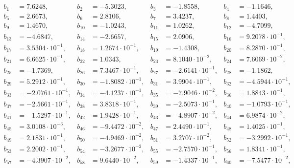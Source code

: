 \begin{align*}
&&&&&&& \\ 
b_{ 1 } &= 7.6248, & b_{ 2 } &= -5.3023, & b_{ 3 } &= -1.8558, & b_{ 4 } &= -1.1646,\\ 
b_{ 5 } &= 2.6673, & b_{ 6 } &= 2.8106, & b_{ 7 } &= 3.4237, & b_{ 8 } &= 1.4403,\\ 
b_{ 9 } &= 1.4670, & b_{ 10 } &= -1.0243, & b_{ 11 } &= 1.0262, & b_{ 12 } &= -4.7099,\\ 
b_{ 13 } &= -4.6847, & b_{ 14 } &= -2.6657, & b_{ 15 } &= 2.0906, & b_{ 16 } &= 9.2078 \cdot 10^{ -1 },\\ 
b_{ 17 } &= 3.5304 \cdot 10^{ -1 }, & b_{ 18 } &= 1.2674 \cdot 10^{ -1 }, & b_{ 19 } &= -1.4308, & b_{ 20 } &= 8.2870 \cdot 10^{ -1 },\\ 
b_{ 21 } &= 6.6625 \cdot 10^{ -1 }, & b_{ 22 } &= 1.0343, & b_{ 23 } &= 8.1040 \cdot 10^{ -2 }, & b_{ 24 } &= 7.6069 \cdot 10^{ -2 },\\ 
b_{ 25 } &= -1.7369, & b_{ 26 } &= 7.3467 \cdot 10^{ -1 }, & b_{ 27 } &= -2.6141 \cdot 10^{ -1 }, & b_{ 28 } &= -1.1862,\\ 
b_{ 29 } &= 5.2912 \cdot 10^{ -1 }, & b_{ 30 } &= -1.8082 \cdot 10^{ -1 }, & b_{ 31 } &= 3.9904 \cdot 10^{ -1 }, & b_{ 32 } &= -4.5944 \cdot 10^{ -1 },\\ 
b_{ 33 } &= -2.0761 \cdot 10^{ -1 }, & b_{ 34 } &= -4.1237 \cdot 10^{ -1 }, & b_{ 35 } &= -7.9046 \cdot 10^{ -2 }, & b_{ 36 } &= 1.8843 \cdot 10^{ -1 },\\ 
b_{ 37 } &= -2.5661 \cdot 10^{ -1 }, & b_{ 38 } &= 3.8318 \cdot 10^{ -1 }, & b_{ 39 } &= -2.5073 \cdot 10^{ -1 }, & b_{ 40 } &= -1.0793 \cdot 10^{ -1 },\\ 
b_{ 41 } &= -1.5297 \cdot 10^{ -1 }, & b_{ 42 } &= 1.9428 \cdot 10^{ -1 }, & b_{ 43 } &= -4.8907 \cdot 10^{ -2 }, & b_{ 44 } &= 6.9874 \cdot 10^{ -2 },\\ 
b_{ 45 } &= 3.0108 \cdot 10^{ -3 }, & b_{ 46 } &= -9.4472 \cdot 10^{ -2 }, & b_{ 47 } &= 2.4490 \cdot 10^{ -1 }, & b_{ 48 } &= 1.4025 \cdot 10^{ -1 },\\ 
b_{ 49 } &= 2.1831 \cdot 10^{ -1 }, & b_{ 50 } &= -4.9469 \cdot 10^{ -2 }, & b_{ 51 } &= 3.2707 \cdot 10^{ -2 }, & b_{ 52 } &= -3.2992 \cdot 10^{ -1 },\\ 
b_{ 53 } &= 2.2002 \cdot 10^{ -1 }, & b_{ 54 } &= -3.2677 \cdot 10^{ -2 }, & b_{ 55 } &= -2.7570 \cdot 10^{ -1 }, & b_{ 56 } &= 1.8341 \cdot 10^{ -1 },\\ 
b_{ 57 } &= -4.3907 \cdot 10^{ -2 }, & b_{ 58 } &= 9.6440 \cdot 10^{ -2 }, & b_{ 59 } &= -1.4337 \cdot 10^{ -1 }, & b_{ 60 } &= -7.5477 \cdot 10^{ -2 },\\ 

\end{align*}
